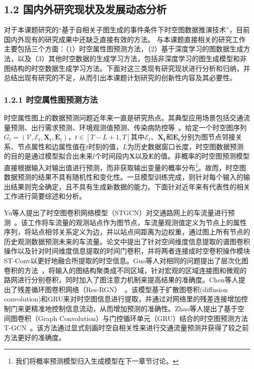 \subsection{1.2 国内外研究现状及发展动态分析}
对于本课题研究的``基于自相关子图生成的事件条件下时空图数据推演技术''，目前国内外现有的研究成果中还缺乏直接有效的方法。 与本课题直接相关的研究工作主要包括三个方面：（1）时空属性图预测方法，（2）基于深度学习的图数据生成方法，以及（3）其他时空数据的生成学习方法，包括非深度学习的图生成模型和非图结构的时空数据生成学习方法。下面对这三类现有研究现状进行分析和归纳，并总结出现有研究的不足，从而引出本课题计划研究的创新性内容及其必要性。

\subsubsection{1.2.1 时空属性图预测方法}
时空属性图上的数据预测问题近年来一直是研究热点。其典型应用场景包括交通流量预测、出行需求预测、环境观测值预测、传染病防控等~\cite{jin2023spatio}。给定一个时空图序列$G_t=(\mathcal{V}, \mathcal{E}_t, \mathbf{X}_t, \mathbf{E}_t)$，$t\in [T-L+1, T]$其中$\mathcal{E}_t$、$\mathbf{X_t}$和$\mathbf{E_t}$分别为图节点邻接关系、节点属性和边属性值在$t$时刻的值，$L$为历史数据窗口长度，时空图数据预测的目的是通过模型拟合出未来$l$个时间段内$\mathbf{X}$以及$\mathbf{E}$的值。非概率的时空图预测模型直接根据输入对输出值进行预测，而非获取输出变量的概率分布\footnote{我们将概率预测模型归入生成模型在下一章节讨论。}。故而，时空图数据预测的结果不具有随机性和变化性。一旦模型训练完成，则针对每个输入的输出结果则完全确定，且不具有生成新数据的能力。下面针对近年来有代表性的相关工作进行简要综述和分析。

Yu等人提出了时空图卷积网络模型（STGCN）对交通路网上的车流量进行预测~\cite{yu2018spatio}。该工作将车流量的观测站点作为图节点，车流量观测值定义为节点上的属性序列，将站点相邻关系定义为边，并以站点间距离为边权重，通过图上所有节点的历史观测数据预测未来的车流量。论文中提出了针对空间维度信息提取的谱图卷积操作以及针对时间维度信息提取的时间门卷积，并将两者连接成时空卷积操作模块ST-Conv以更好地融合所提取的时空信息。Guo等人对相同的问题提出了层次化图卷积的方法~\cite{Guo19attention}，将输入的图结构聚类成不同区域，针对宏观的区域连接图和微观的路网进行分别卷积，同时加入了图注意力机制来提高结果的准确度。Chen等人提出了残差循环图卷积网络（Res-RGN）~\cite{chen2019gated}。该模型基于扩散图卷积(diffusion convolution)和GRU来对时空图信息进行提取，并通过对网络里的残差连接增加控制门来更精准地控制信息流动，从而增加预测的准确性。Zhao等人提出了基于空间图卷积（Graph Convolution）与门控循环单元（GRU）结合的时空图预测方法T-GCN~\cite{zhao2019t}。该方法通过显式刻画时空自相关性来进行交通流量预测并获得了较之前方法更好的准确度。

